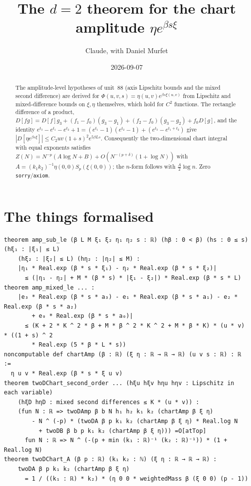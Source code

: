 \documentclass[11pt]{article}
\title{The $d=2$ theorem for the chart amplitude $\eta e^{\beta s\xi}$}
\author{Claude, with Daniel Murfet}
\date{2026-09-07}
\begin{document}
\maketitle
\sloppy

\begin{abstract}
The amplitude-level hypotheses of unit~88 (axis Lipschitz bounds and the mixed second difference)
are derived for $\Phi(u,v,s)=\eta(u,v)e^{\beta s\xi(u,v)}$ from Lipschitz and mixed-difference bounds
on $\xi,\eta$ themselves, which hold for $C^2$ functions. The rectangle difference of a product,
$D[fg]=D[f]g_3+(f_1-f_0)(g_3-g_1)+(f_2-f_0)(g_3-g_2)+f_0D[g]$, and the identity
$e^{t_3}-e^{t_1}-e^{t_2}+1=(e^{t_1}-1)(e^{t_2}-1)+(e^{t_3}-e^{t_1+t_2})$ give
$|D[\eta e^{\beta s\xi}]|\le C_2uv(1+s)^2e^{5\beta Ls}$. Consequently the two-dimensional chart integral
with equal exponents satisfies $Z(N)=N^{-p}(A\log N+B)+O(N^{-(p+\delta)}(1+\log N))$ with
$A=(k_1k_2)^{-1}\eta(0,0)S_p(\xi(0,0))$; the $n$-form follows with $\tfrac A2\log n$. Zero
\texttt{sorry}/\texttt{axiom}.
\end{abstract}

\section{The things formalised}
{\small
\begin{verbatim}
theorem amp_sub_le (β L M ξ₁ ξ₂ η₁ η₂ s : ℝ) (hβ : 0 < β) (hs : 0 ≤ s) (hξ₁ : |ξ₁| ≤ L)
    (hξ₂ : |ξ₂| ≤ L) (hη₂ : |η₂| ≤ M) :
    |η₁ * Real.exp (β * s * ξ₁) - η₂ * Real.exp (β * s * ξ₂)|
      ≤ (|η₁ - η₂| + M * (β * s) * |ξ₁ - ξ₂|) * Real.exp (β * s * L)
theorem amp_mixed_le ... :
    |e₃ * Real.exp (β * s * a₃) - e₁ * Real.exp (β * s * a₁) - e₂ * Real.exp (β * s * a₂)
        + e₀ * Real.exp (β * s * a₀)|
      ≤ (K + 2 * K ^ 2 * β + M * β ^ 2 * K ^ 2 + M * β * K) * (u * v) * ((1 + s) ^ 2
        * Real.exp (5 * β * L * s))
noncomputable def chartAmp (β : ℝ) (ξ η : ℝ → ℝ → ℝ) (u v s : ℝ) : ℝ :=
  η u v * Real.exp (β * s * ξ u v)
theorem twoDChart_second_order ... (hξu hξv hηu hηv : Lipschitz in each variable)
    (hξD hηD : mixed second differences ≤ K * (u * v)) :
    (fun N : ℝ => twoDAmp β b N h₁ h₂ k₁ k₂ (chartAmp β ξ η)
        - N ^ (-p) * (twoDA β p k₁ k₂ (chartAmp β ξ η) * Real.log N
          + twoDB β b p k₁ k₂ (chartAmp β ξ η))) =O[atTop]
      fun N : ℝ => N ^ (-(p + min (k₁ : ℝ)⁻¹ (k₂ : ℝ)⁻¹)) * (1 + Real.log N)
theorem twoDChart_A (β p : ℝ) (k₁ k₂ : ℕ) (ξ η : ℝ → ℝ → ℝ) :
    twoDA β p k₁ k₂ (chartAmp β ξ η)
      = 1 / ((k₁ : ℝ) * k₂) * (η 0 0 * weightedMass β (ξ 0 0) (p - 1))
\end{verbatim}
}
\end{document}
